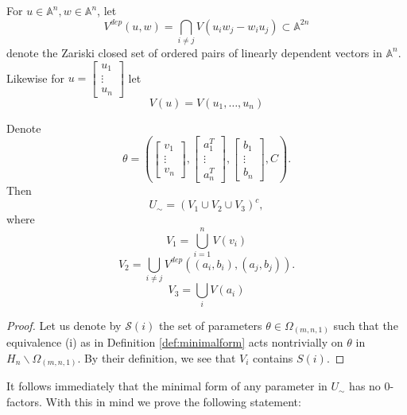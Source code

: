 \documentclass[11pt,letterpaper]{amsart}
\begin{document}
\begin{defin}
    For $u\in \mathbb{A}^n, w\in \mathbb{A}^n$, let
    $$
    V^{dep}(u, w) = \bigcap_{i\neq j} V(u_i w_j - w_i u_j) \subset \mathbb{A}^{2n}
    $$
    denote the Zariski closed set of ordered pairs of linearly dependent vectors in $\mathbb{A}^n$. Likewise for $u = \begin{bmatrix}
        u_1 \\ \vdots \\ u_n
    \end{bmatrix}$ let
    $$
    V(u) = V(u_1, \ldots, u_n)
    $$
\end{defin}
\begin{lemma}
    Denote
    $$
    \theta = \left(\begin{bmatrix}
        v_1 \\ \vdots \\ v_n
    \end{bmatrix}, \begin{bmatrix}
        a_1^T \\ \vdots \\ a_n^T
    \end{bmatrix}, \begin{bmatrix}
        b_1 \\ \vdots \\ b_n
    \end{bmatrix}, C\right).
    $$
    Then 
    $$
    U_\sim = (V_1 \cup V_2 \cup V_3)^c,
    $$
    where
    $$
    V_1 = \bigcup_{i=1}^n V(v_i)
    $$
    $$
    V_2 = \bigcup_{i\neq j} V^{dep}((a_i, b_i), (a_j, b_j)).
    $$
    $$
    V_3 = \bigcup_{i}V(a_i)
    $$
\end{lemma}
\begin{proof}
    Let us denote by $\mathcal{S}(i)$ the set of parameters $\theta\in \Omega_{(m,n,1)}$ such that the equivalence (i) as in Definition \ref{def:minimalform} acts nontrivially on $\theta$ in $H_n\backslash \Omega_{(m,n,1)}$. By their definition, we see that $V_i$ contains $S(i)$.
\end{proof}
It follows immediately that the minimal form of any parameter in $U_\sim$ has no $0$-factors. With this in mind we prove the following statement:
\end{document}
